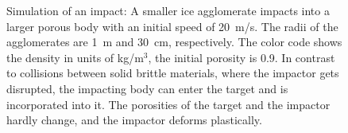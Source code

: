 \begin{figure}
\caption{Simulation of an
impact: A smaller ice agglomerate impacts into a larger porous body with an
initial speed of 20~m/s. The radii of the agglomerates are 1~m and 30~cm,
respectively. The color code shows the density in units of kg/m$^3$, the
initial porosity is 0.9. In contrast to collisions between solid brittle
materials, where the impactor gets disrupted, the impacting body can enter
the target and is incorporated into it. The porosities of the target and the
impactor hardly change, and the impactor deforms plastically.}
\label{fig:b4_1}
\end{figure}
%
%
%
%
%
